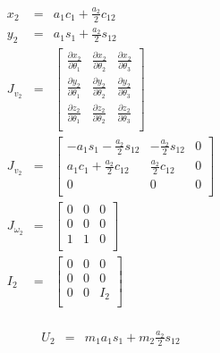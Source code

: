\documentclass[a4paper]{article}
\begin{document}
\begin{eqnarray*}
x_2 & = & a_1 c_1 + \frac{a_2}{2}c_{12}\\
y_2 & = & a_1 s_1 + \frac{a_2}{2}s_{12}\\
J_{v_2} & = & \begin{bmatrix}
			  \frac{\partial x_2}{\partial \theta_1} & \frac{\partial x_2}{\partial \theta_2} & \frac{\partial x_2}{\partial \theta_3} \\
              \frac{\partial y_2}{\partial \theta_1} & \frac{\partial y_2}{\partial \theta_2} & \frac{\partial y_2}{\partial \theta_3} \\
              \frac{\partial z_2}{\partial \theta_1} & \frac{\partial z_2}{\partial \theta_2} & \frac{\partial z_2}{\partial \theta_3} \\
			  \end{bmatrix}\\
J_{v_2} & = & \begin{bmatrix}
			  -a_1s_1 -\frac{a_2}{2}s_{12} & - \frac{a_2}{2} s_{12} & 0\\
              a_1 c_1 + \frac{a_2}{2}c_{12} & \frac{a_2}{2}c_{12} & 0 \\
              0 & 0 & 0\\
			  \end{bmatrix}\\
J_{\omega_2} & = & \begin{bmatrix}
			  0 & 0 & 0\\
              0 & 0 & 0\\
              1 & 1 & 0\\
			  \end{bmatrix}\\
I_2 & = & \begin{bmatrix}
		  0 & 0 & 0\\
          0 & 0 & 0\\
          0 & 0 & I_2\\
	      \end{bmatrix}\\              
\end{eqnarray*}

\begin{eqnarray*}
U_2 & = & m_1 a_1 s_1 + m_2 \frac{a_2}{2}s_{12}\\
\end{eqnarray*}
\end{document}
